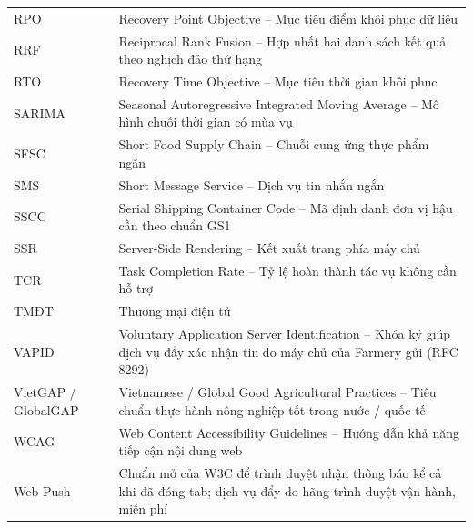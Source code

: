 \begin{longtable}{L{3.4cm} L{12cm}}
RPO & Recovery Point Objective -- Mục tiêu điểm khôi phục dữ liệu \\
RRF & Reciprocal Rank Fusion -- Hợp nhất hai danh sách kết quả theo nghịch đảo thứ hạng \\
RTO & Recovery Time Objective -- Mục tiêu thời gian khôi phục \\
SARIMA & Seasonal Autoregressive Integrated Moving Average -- Mô hình chuỗi thời gian có mùa vụ \\
SFSC & Short Food Supply Chain -- Chuỗi cung ứng thực phẩm ngắn \\
SMS & Short Message Service -- Dịch vụ tin nhắn ngắn \\
SSCC & Serial Shipping Container Code -- Mã định danh đơn vị hậu cần theo chuẩn GS1 \\
SSR & Server-Side Rendering -- Kết xuất trang phía máy chủ \\
TCR & Task Completion Rate -- Tỷ lệ hoàn thành tác vụ không cần hỗ trợ \\
TMĐT & Thương mại điện tử \\
VAPID & Voluntary Application Server Identification -- Khóa ký giúp dịch vụ đẩy xác nhận tin do máy chủ của Farmery gửi (RFC 8292) \\
VietGAP / GlobalGAP & Vietnamese / Global Good Agricultural Practices -- Tiêu chuẩn thực hành nông nghiệp tốt trong nước / quốc tế \\
WCAG & Web Content Accessibility Guidelines -- Hướng dẫn khả năng tiếp cận nội dung web \\
Web Push & Chuẩn mở của W3C để trình duyệt nhận thông báo kể cả khi đã đóng tab; dịch vụ đẩy do hãng trình duyệt vận hành, miễn phí \\
\end{longtable}
\endgroup
